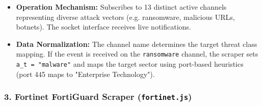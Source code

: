 \begin{itemize}
    \item \textbf{Operation Mechanism:} Subscribes to 13 distinct active channels representing diverse attack vectors (e.g. ransomware, malicious URLs, botnets). The socket interface receives live notifications.
    \item \textbf{Data Normalization:} The channel name determines the target threat class mapping. If the event is received on the \texttt{ransomware} channel, the scraper sets \texttt{a\_t = "malware"} and maps the target sector using port-based heuristics (port 445 maps to "Enterprise Technology").
\end{itemize}

\subsubsection{3. Fortinet FortiGuard Scraper (\texttt{fortinet.js})}
